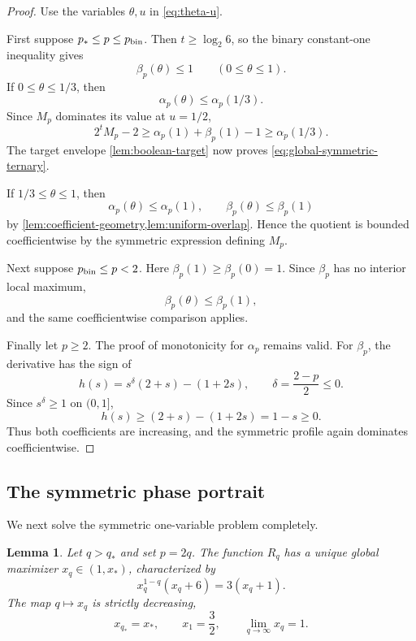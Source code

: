 \documentclass[11pt,reqno]{amsart}
\numberwithin{equation}{section}
\newtheorem{lemma}[lemma]{Lemma}
\theoremstyle{definition}
\theoremstyle{remark}
\begin{document}
\begin{proof}
Use the variables $\theta,u$ in \eqref{eq:theta-u}.

First suppose $p_*\le p\le p_{\rm bin}$.  Then $t\ge\log_2 6$, so the
binary constant-one inequality gives
\[
  \beta_p(\theta)\le1
  \qquad(0\le\theta\le1).
\]
If $0\le\theta\le1/3$, then
\[
  \alpha_p(\theta)\le\alpha_p(1/3).
\]
Since $M_p$ dominates its value at $u=1/2$,
\[
  2^tM_p-2
  \ge\alpha_p(1)+\beta_p(1)-1
  \ge\alpha_p(1/3).
\]
The target envelope \cref{lem:boolean-target} now proves
\eqref{eq:global-symmetric-ternary}.

If $1/3\le\theta\le1$, then
\[
  \alpha_p(\theta)\le\alpha_p(1),
  \qquad
  \beta_p(\theta)\le\beta_p(1)
\]
by \cref{lem:coefficient-geometry,lem:uniform-overlap}.  Hence the quotient
is bounded coefficientwise by the symmetric expression defining $M_p$.

Next suppose $p_{\rm bin}\le p<2$.  Here
$\beta_p(1)\ge\beta_p(0)=1$.  Since $\beta_p$ has no interior local maximum,
\[
  \beta_p(\theta)\le\beta_p(1),
\]
and the same coefficientwise comparison applies.

Finally let $p\ge2$.  The proof of monotonicity for $\alpha_p$ remains valid.
For $\beta_p$, the derivative has the sign of
\[
  h(s)=s^\delta(2+s)-(1+2s),
  \qquad \delta=\frac{2-p}{2}\le0.
\]
Since $s^\delta\ge1$ on $(0,1]$,
\[
  h(s)\ge(2+s)-(1+2s)=1-s\ge0.
\]
Thus both coefficients are increasing, and the symmetric profile again
dominates coefficientwise.
\end{proof}

\subsection{The symmetric phase portrait}

We next solve the symmetric one-variable problem completely.

\begin{lemma}\label{lem:symmetric-phase}
Let $q>q_*$ and set $p=2q$.  The function $R_q$ has a unique global
maximizer $x_q\in(1,x_*)$, characterized by
\begin{equation}\label{eq:xq-critical}
  x_q^{1-q}(x_q+6)=3(x_q+1).
\end{equation}
The map $q\mapsto x_q$ is strictly decreasing,
\[
  x_{q_*}=x_*,
  \qquad x_1=\frac32,
  \qquad \lim_{q\to\infty}x_q=1.
\]
\end{lemma}
\end{document}
